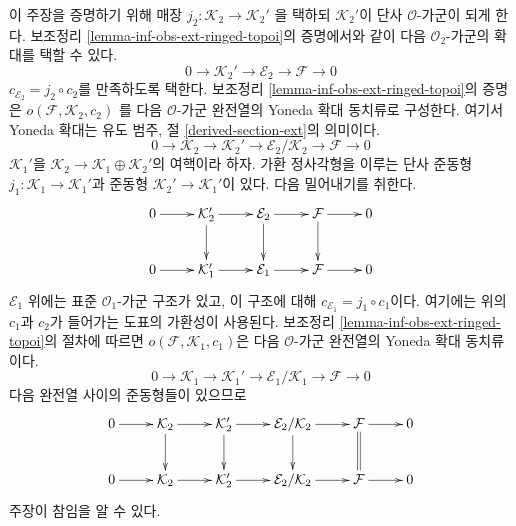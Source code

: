 \begin{remark}
\medskip\noindent
이 주장을 증명하기 위해 매장
$j_2 : \mathcal{K}_2 \to \mathcal{K}_2'$
을 택하되 $\mathcal{K}_2'$이 단사 $\mathcal{O}$-가군이 되게 한다.
보조정리 \ref{lemma-inf-obs-ext-ringed-topoi}의 증명에서와 같이
다음 $\mathcal{O}_2$-가군의 확대를 택할 수 있다.
$$
0 \to \mathcal{K}_2' \to \mathcal{E}_2 \to \mathcal{F} \to 0
$$
$c_{\mathcal{E}_2} = j_2 \circ c_2$를 만족하도록 택한다.
보조정리 \ref{lemma-inf-obs-ext-ringed-topoi}의 증명은
$o(\mathcal{F}, \mathcal{K}_2, c_2)$
를 다음 $\mathcal{O}$-가군 완전열의 Yoneda 확대 동치류로 구성한다.
여기서 Yoneda 확대는 유도 범주, 절 \ref{derived-section-ext}의 의미이다.
$$
0 \to
\mathcal{K}_2 \to \mathcal{K}_2' \to
\mathcal{E}_2/\mathcal{K}_2 \to
\mathcal{F} \to 0
$$
$\mathcal{K}_1'$을 $\mathcal{K}_2 \to
\mathcal{K}_1 \oplus \mathcal{K}_2'$의 여핵이라 하자. 가환 정사각형을
이루는 단사 준동형 $j_1 : \mathcal{K}_1 \to \mathcal{K}_1'$과 준동형
$\mathcal{K}_2' \to \mathcal{K}_1'$이 있다. 다음 밀어내기를 취한다.
$$
\xymatrix{
0 \ar[r] &
\mathcal{K}_2' \ar[r] \ar[d] &
\mathcal{E}_2 \ar[r] \ar[d] &
\mathcal{F} \ar[r] \ar[d] & 0 \\
0 \ar[r] &
\mathcal{K}_1' \ar[r] &
\mathcal{E}_1 \ar[r] &
\mathcal{F} \ar[r] & 0
}
$$
$\mathcal{E}_1$ 위에는 표준 $\mathcal{O}_1$-가군 구조가 있고, 이 구조에
대해 $c_{\mathcal{E}_1} = j_1 \circ c_1$이다. 여기에는 위의 $c_1$과
$c_2$가 들어가는 도표의 가환성이 사용된다. 보조정리
\ref{lemma-inf-obs-ext-ringed-topoi}의 절차에 따르면
$o(\mathcal{F}, \mathcal{K}_1, c_1)$은 다음 $\mathcal{O}$-가군
완전열의 Yoneda 확대 동치류이다.
$$
0 \to
\mathcal{K}_1 \to
\mathcal{K}_1' \to
\mathcal{E}_1/\mathcal{K}_1 \to
\mathcal{F} \to 0
$$
다음 완전열 사이의 준동형들이 있으므로
$$
\xymatrix{
0 \ar[r] &
\mathcal{K}_2 \ar[d] \ar[r] &
\mathcal{K}_2' \ar[d] \ar[r] &
\mathcal{E}_2/\mathcal{K}_2 \ar[r] \ar[d] &
\mathcal{F} \ar[r] \ar@{=}[d] &
0 \\
0 \ar[r] &
\mathcal{K}_2 \ar[r] &
\mathcal{K}_2' \ar[r] &
\mathcal{E}_2/\mathcal{K}_2 \ar[r] &
\mathcal{F} \ar[r] &
0
}
$$
주장이 참임을 알 수 있다.
\end{remark}

